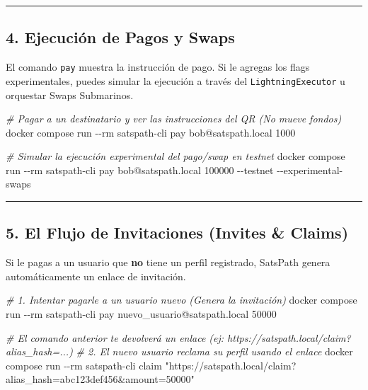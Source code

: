 \documentclass[
]{article}
\newenvironment{Shaded}{}{}
\newcommand{\AttributeTok}[1]{\textcolor[rgb]{0.49,0.56,0.16}{#1}}
\newcommand{\CommentTok}[1]{\textcolor[rgb]{0.38,0.63,0.69}{\textit{#1}}}
\newcommand{\ExtensionTok}[1]{#1}
\newcommand{\NormalTok}[1]{#1}
\newcommand{\StringTok}[1]{\textcolor[rgb]{0.25,0.44,0.63}{#1}}
\begin{document}
\begin{center}\rule{0.5\linewidth}{0.5pt}\end{center}

\hypertarget{ejecuciuxf3n-de-pagos-y-swaps}{%
\subsection{4. Ejecución de Pagos y
Swaps}\label{ejecuciuxf3n-de-pagos-y-swaps}}

El comando \texttt{pay} muestra la instrucción de pago. Si le agregas
los flags experimentales, puedes simular la ejecución a través del
\texttt{LightningExecutor} u orquestar Swaps Submarinos.

\begin{Shaded}
\begin{Highlighting}[]
\CommentTok{\# Pagar a un destinatario y ver las instrucciones del QR (No mueve fondos)}
\ExtensionTok{docker}\NormalTok{ compose run }\AttributeTok{{-}{-}rm}\NormalTok{ satspath{-}cli pay bob@satspath.local 1000}

\CommentTok{\# Simular la ejecución experimental del pago/swap en testnet}
\ExtensionTok{docker}\NormalTok{ compose run }\AttributeTok{{-}{-}rm}\NormalTok{ satspath{-}cli pay bob@satspath.local 100000 }\AttributeTok{{-}{-}testnet} \AttributeTok{{-}{-}experimental{-}swaps}
\end{Highlighting}
\end{Shaded}

\begin{center}\rule{0.5\linewidth}{0.5pt}\end{center}

\hypertarget{el-flujo-de-invitaciones-invites-claims}{%
\subsection{5. El Flujo de Invitaciones (Invites \&
Claims)}\label{el-flujo-de-invitaciones-invites-claims}}

Si le pagas a un usuario que \textbf{no} tiene un perfil registrado,
SatsPath genera automáticamente un enlace de invitación.

\begin{Shaded}
\begin{Highlighting}[]
\CommentTok{\# 1. Intentar pagarle a un usuario nuevo (Genera la invitación)}
\ExtensionTok{docker}\NormalTok{ compose run }\AttributeTok{{-}{-}rm}\NormalTok{ satspath{-}cli pay nuevo\_usuario@satspath.local 50000}

\CommentTok{\# El comando anterior te devolverá un enlace (ej: https://satspath.local/claim?alias\_hash=...)}
\CommentTok{\# 2. El nuevo usuario reclama su perfil usando el enlace}
\ExtensionTok{docker}\NormalTok{ compose run }\AttributeTok{{-}{-}rm}\NormalTok{ satspath{-}cli claim }\StringTok{"https://satspath.local/claim?alias\_hash=abc123def456\&amount=50000"}
\end{Highlighting}
\end{Shaded}
\end{document}
